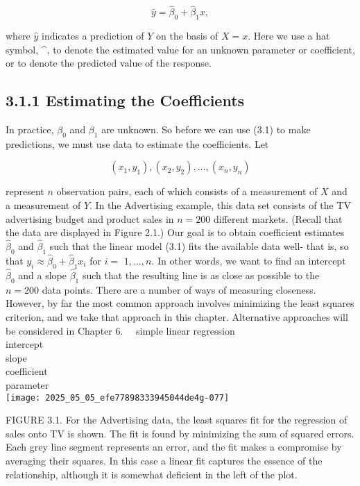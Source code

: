 \documentclass[10pt]{article}
\begin{document}
\begin{equation*}
\hat{y}=\hat{\beta}_{0}+\hat{\beta}_{1} x, \tag{3.2}
\end{equation*}


where $\hat{y}$ indicates a prediction of $Y$ on the basis of $X=x$. Here we use a hat symbol, \^{}, to denote the estimated value for an unknown parameter or coefficient, or to denote the predicted value of the response.

\subsection*{3.1.1 Estimating the Coefficients}
In practice, $\beta_{0}$ and $\beta_{1}$ are unknown. So before we can use (3.1) to make predictions, we must use data to estimate the coefficients. Let

$$
\left(x_{1}, y_{1}\right),\left(x_{2}, y_{2}\right), \ldots,\left(x_{n}, y_{n}\right)
$$

represent $n$ observation pairs, each of which consists of a measurement of $X$ and a measurement of $Y$. In the Advertising example, this data set consists of the TV advertising budget and product sales in $n=200$ different markets. (Recall that the data are displayed in Figure 2.1.) Our goal is to obtain coefficient estimates $\hat{\beta}_{0}$ and $\hat{\beta}_{1}$ such that the linear model (3.1) fits the available data well- that is, so that $y_{i} \approx \hat{\beta}_{0}+\hat{\beta}_{1} x_{i}$ for $i=$ $1, \ldots, n$. In other words, we want to find an intercept $\hat{\beta}_{0}$ and a slope $\hat{\beta}_{1}$ such that the resulting line is as close as possible to the $n=200$ data points. There are a number of ways of measuring closeness. However, by far the most common approach involves minimizing the least squares criterion, and we take that approach in this chapter. Alternative approaches will be considered in Chapter 6.\
\
simple linear regression\\
intercept\\
slope\\
coefficient\\
parameter\\
\texttt{[image: 2025\_05\_05\_efe77898333945044de4g-077]}

FIGURE 3.1. For the Advertising data, the least squares fit for the regression of sales onto TV is shown. The fit is found by minimizing the sum of squared errors. Each grey line segment represents an error, and the fit makes a compromise by averaging their squares. In this case a linear fit captures the essence of the relationship, although it is somewhat deficient in the left of the plot.
\end{document}
